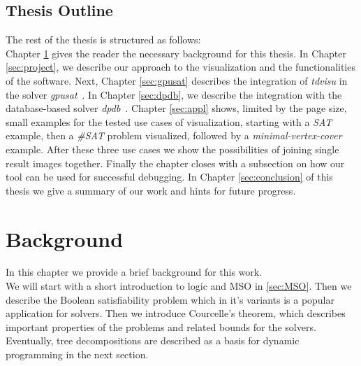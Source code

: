 \documentclass[a4paper, 12pt, bibliography=totoc]{scrartcl}
\begin{document}
\subsection{Thesis Outline}
The rest of the thesis is structured as follows: \\
Chapter \ref{sec:bg} gives the reader the necessary background for this thesis. In Chapter \ref{sec:project}, we describe our approach to the visualization and the functionalities of the software. Next, Chapter \ref{sec:gpusat} describes the integration of \textit{tdvisu} in the solver \textit{gpusat}~\cite{DiplomarbeitZisser}. In Chapter \ref{sec:dpdb}, we describe the integration with the database-based solver \textit{dpdb}~\cite{dpdbpadl2020}.
Chapter \ref{sec:appl} shows, limited by the page size, small examples for the tested use cases of visualization, starting with a \textit{SAT} example, then a \textit{\#SAT} problem visualized, followed by a \textit{minimal-vertex-cover} example. After these three use cases we show the possibilities of joining single result images together. Finally the chapter closes with a subsection on how our tool can be used for successful debugging. In Chapter \ref{sec:conclusion} of this thesis we give a summary of our work and hints for future progress.

\section{Background}\label{sec:bg}
In this chapter we provide a brief background for this work.\\
We will start with a short introduction to logic and MSO in \ref{sec:MSO}. Then we describe the Boolean satisfiability problem which in it's variants is a popular application for solvers.
Then we introduce Courcelle's theorem, which describes important properties of the problems and related bounds for the solvers.
Eventually, tree decompositions are described as a basis for dynamic programming in the next section.
\end{document}
